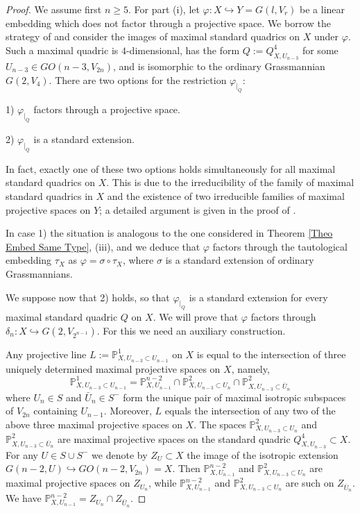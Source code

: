 \documentclass[12pt]{amsart}
\def\PP {{\mathbb P}}     %
\begin{document}
\begin{proof}
We assume first $n\geq 5$. For part (i), let $\varphi:X\hookrightarrow Y=G(l,V_r)$ be a linear embedding which does not factor through a projective space. We borrow the strategy of \cite{Penkov-Tikhomirov-Lin-ind-Grass} and consider the images of maximal standard quadrics on $X$ under $\varphi$. Such a maximal quadric is $4$-dimensional, has the form $Q:=Q^4_{X,U_{n-3}}$ for some $U_{n-3}\in GO(n-3,V_{2n})$, and is isomorphic to the ordinary Grassmannian $G(2,V_4)$. There are two options for the restriction $\varphi_{\vert_Q}$:

1) $\varphi_{\vert_{Q}}$ factors through a projective space.

2) $\varphi_{\vert_{Q}}$ is a standard extension.

In fact, exactly one of these two options holds simultaneously for all maximal standard quadrics on $X$. This is due to the irreducibility of the family of maximal standard quadrics in $X$ and the existence of two irreducible families of maximal projective spaces on $Y$; a detailed argument is given in the proof of \cite[Proposition 3.15]{Penkov-Tikhomirov-Lin-ind-Grass}.

In case 1) the situation is analogous to the one considered in Theorem \ref{Theo Embed Same Type}, (iii), and we deduce that $\varphi$ factors through the tautological embedding $\tau_X$ as $\varphi=\sigma\circ \tau_X$, where $\sigma$ is a standard extension of ordinary Grassmannians.

We suppose now that 2) holds, so that $\varphi_{\vert_{Q}}$ is a standard extension for every maximal standard quadric $Q$ on $X$. We will prove that $\varphi$ factors through $\delta_n:X\hookrightarrow G(2,V_{2^{n-1}})$. For this we need an auxiliary construction.

Any projective line $L:=\PP^1_{X,U_{n-3}\subset U_{n-1}}$ on $X$ is equal to the intersection of three uniquely determined maximal projective spaces on $X$, namely,
$$
\PP^1_{X,U_{n-3}\subset U_{n-1}} = \PP^{n-2}_{X, U_{n-1}} \cap \PP^2_{X,U_{n-3}\subset U_n} \cap \PP^2_{X,U_{n-3}\subset \bar U_n} 
$$
where $U_n\in S$ and $\bar U_n\in S^-$ form the unique pair of maximal isotropic subspaces of $V_{2n}$ containing $U_{n-1}$. Moreover, $L$ equals the intersection of any two of the above three maximal projective spaces on $X$. The spaces $\PP^2_{X,U_{n-3}\subset U_n}$ and $\PP^2_{X,U_{n-3}\subset \bar U_n}$ are maximal projective spaces on the standard quadric $Q^4_{X,U_{n-3}}\subset X$. For any $U\in S\cup S^-$ we denote by $Z_U\subset X$ the image of the isotropic extension $G(n-2,U)\hookrightarrow GO(n-2,V_{2n})=X$. Then $\PP^{n-2}_{X, U_{n-1}}$ and $\PP^2_{X,U_{n-3}\subset U_n}$ are maximal projective spaces on $Z_{U_n}$, while $\PP^{n-2}_{X, U_{n-1}}$ and $\PP^2_{X,U_{n-3}\subset U_n}$ are such on $Z_{\bar U_n}$. We have $\PP^{n-2}_{X,U_{n-1}}=Z_{U_n}\cap Z_{\bar U_n}$.


\end{proof}
\end{document}
